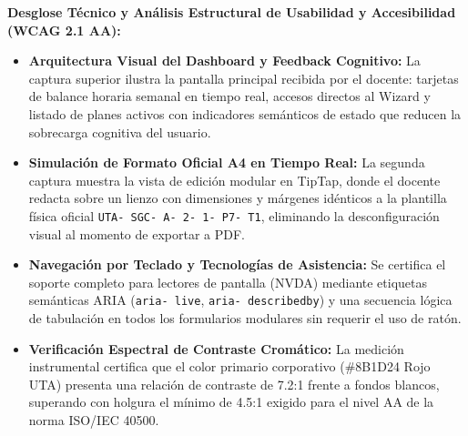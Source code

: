 \documentclass[12pt,a4paper]{article}
\begin{document}
\noindent
\noindent
\textbf{Desglose Técnico y Análisis Estructural de Usabilidad y Accesibilidad (WCAG 2.1 AA):}
\begin{itemize}[leftmargin=1.5em, itemsep=3pt]
    \item \textbf{Arquitectura Visual del Dashboard y Feedback Cognitivo:} La captura superior ilustra la pantalla principal recibida por el docente: tarjetas de balance horaria semanal en tiempo real, accesos directos al Wizard y listado de planes activos con indicadores semánticos de estado que reducen la sobrecarga cognitiva del usuario.
    \item \textbf{Simulación de Formato Oficial A4 en Tiempo Real:} La segunda captura muestra la vista de edición modular en TipTap, donde el docente redacta sobre un lienzo con dimensiones y márgenes idénticos a la plantilla física oficial \texttt{UTA- SGC- A- 2- 1- P7- T1}, eliminando la desconfiguración visual al momento de exportar a PDF.
    \item \textbf{Navegación por Teclado y Tecnologías de Asistencia:} Se certifica el soporte completo para lectores de pantalla (NVDA) mediante etiquetas semánticas ARIA (\texttt{aria- live}, \texttt{aria- describedby}) y una secuencia lógica de tabulación en todos los formularios modulares sin requerir el uso de ratón.
    \item \textbf{Verificación Espectral de Contraste Cromático:} La medición instrumental certifica que el color primario corporativo (\#8B1D24 Rojo UTA) presenta una relación de contraste de 7.2:1 frente a fondos blancos, superando con holgura el mínimo de 4.5:1 exigido para el nivel AA de la norma ISO/IEC 40500.
\end{itemize}
\end{document}
